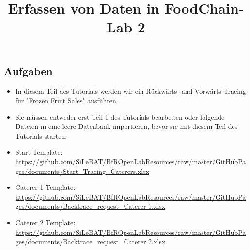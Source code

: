 \documentclass{beamer}
\title{Erfassen von Daten in FoodChain-Lab 2}
\date{}
\begin{document}
\maketitle

\section{ }

\subsection{Aufgaben}
\begin{frame}
	\begin{itemize}
		\item In diesem Teil des Tutorials werden wir ein Rückwärts- and Vorwärts-Tracing für "Frozen Fruit Sales" ausführen.
		\item Sie müssen entweder erst Teil 1 des Tutorials bearbeiten oder folgende Dateien in eine leere Datenbank importieren, bevor sie mit diesem Teil des Tutorials starten.
		\item Start Template: \url{https://github.com/SiLeBAT/BfROpenLabResources/raw/master/GitHubPages/documents/Start_Tracing_Caterers.xlsx}
		\item Caterer 1 Template: \url{https://github.com/SiLeBAT/BfROpenLabResources/raw/master/GitHubPages/documents/Backtrace_request_Caterer 1.xlsx}
		\item Caterer 2 Template: \url{https://github.com/SiLeBAT/BfROpenLabResources/raw/master/GitHubPages/documents/Backtrace_request_Caterer 2.xlsx}
	\end{itemize}
\end{frame}
 
\end{document}
